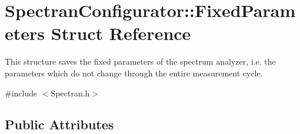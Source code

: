 \hypertarget{structSpectranConfigurator_1_1FixedParameters}{}\section{Spectran\+Configurator\+:\+:Fixed\+Parameters Struct Reference}
\label{structSpectranConfigurator_1_1FixedParameters}


This structure saves the fixed parameters of the spectrum analyzer, i.\+e. the parameters which do not change through the entire measurement cycle.  




{\ttfamily \#include $<$Spectran.\+h$>$}

\subsection*{Public Attributes}
